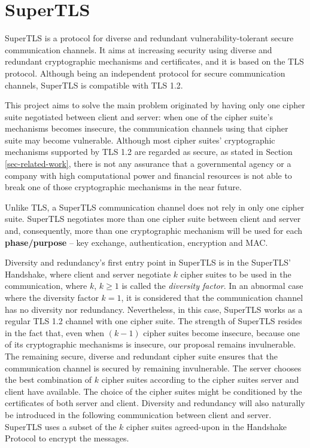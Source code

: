 \documentclass{sig-alternate-05-2015}
\begin{document}
\section{SuperTLS}

SuperTLS is a protocol for diverse and redundant vulnerability-tolerant secure communication channels. It aims at increasing security using diverse and redundant cryptographic mechanisms and certificates, and it is based on the TLS protocol. Although being an independent protocol for secure communication channels, SuperTLS is compatible with TLS 1.2.

This project aims to solve the main problem originated by having only one cipher suite negotiated between client and server: when one of the cipher suite's mechanisms becomes insecure, the communication channels using that cipher suite may become vulnerable.
Although most cipher suites' cryptographic mechanisms supported by TLS 1.2 are regarded as secure, as stated in Section \ref{sec-related-work}, there is not any assurance that a governmental agency or a company with high computational power and financial resources is not able to break one of those cryptographic mechanisms in the near future.

Unlike TLS, a SuperTLS communication channel does not rely in only one cipher suite. SuperTLS negotiates more than one cipher suite between client and server and, consequently, more than one cryptographic mechanism will be used for each \textbf{phase/purpose} -- key exchange, authentication, encryption and MAC.

Diversity and redundancy's first entry point in SuperTLS is in the SuperTLS' Handshake, where client and server negotiate $k$ cipher suites to be used in the communication, where $k$, $k\geq1$ is called the \textit{diversity factor}. In an abnormal case where the diversity factor $k = 1$, it is considered that the communication channel has no diversity nor redundancy. Nevertheless, in this case, SuperTLS works as a regular TLS 1.2 channel with one cipher suite.
The strength of SuperTLS resides in the fact that, even when $(k - 1)$ cipher suites become insecure, because one of its cryptographic mechanisms is insecure, our proposal remains invulnerable. The remaining secure, diverse and redundant cipher suite ensures that the communication channel is secured by remaining invulnerable.
The server chooses the best combination of $k$ cipher suites according to the cipher suites server and client have available. The choice of the cipher suites might be conditioned by the certificates of both server and client.
Diversity and redundancy will also naturally be introduced in the following communication between client and server. SuperTLS uses a subset of the $k$ cipher suites agreed-upon in the Handshake Protocol to encrypt the messages.
\end{document}
